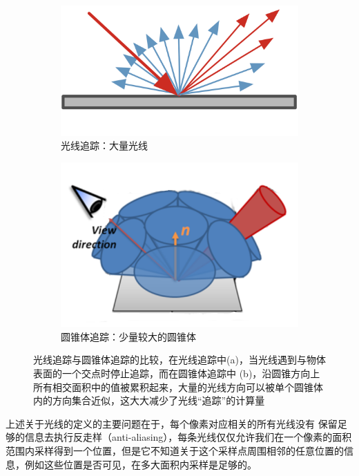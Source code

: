 \begin{figure}
	\begin{subfigure}[b]{0.5\textwidth}
		\includegraphics[width=\textwidth]{figures/vct/vct-1-1}
		\caption{光线追踪：大量光线}
	\end{subfigure}
	\begin{subfigure}[b]{0.5\textwidth}
		\includegraphics[width=\textwidth]{figures/vct/vct-1-2}
		\caption{圆锥体追踪：少量较大的圆锥体}
	\end{subfigure}
	\caption{光线追踪与圆锥体追踪的比较，在光线追踪中(a)，当光线遇到与物体表面的一个交点时停止追踪，而在圆锥体追踪中 (b)，沿圆锥方向上所有相交面积中的值被累积起来，大量的光线方向可以被单个圆锥体内的方向集合近似，这大大减少了光线“追踪”的计算量}
	\label{f:vct-ray-vs-cone}
\end{figure}

上述关于光线的定义的主要问题在于，每个像素对应相关的所有光线没有 保留足够的信息去执行反走样（anti-aliasing），每条光线仅仅允许我们在一个像素的面积范围内采样得到一个位置，但是它不知道关于这个采样点周围相邻的任意位置的信息，例如这些位置是否可见，在多大面积内采样是足够的。

